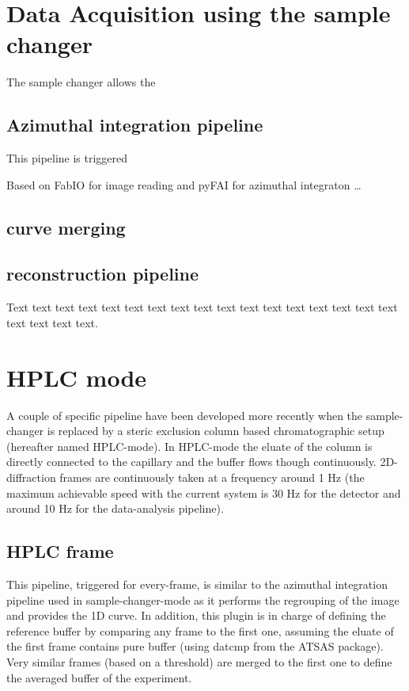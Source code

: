 \documentclass[preprint]{iucr}              %
\begin{document}
\section{Data Acquisition using the sample changer}

The sample changer allows the 


\subsection{Azimuthal integration pipeline}

This pipeline is triggered 

Based on FabIO\cite{fabio} for image reading and pyFAI\cite{pyFAI} for azimuthal
integraton \ldots

\subsection{curve merging}


\subsection{ reconstruction pipeline}

Text text text text text text text text text text text text text text
text text text text text text text.

\section{HPLC mode}

A couple of specific pipeline have been developed more recently when the
sample-changer is replaced by a steric exclusion column based  chromatographic
setup (hereafter named HPLC-mode).
In HPLC-mode the eluate of the column is directly connected to the capillary
and the buffer flows though continuously. 2D-diffraction frames are continuously
taken at a frequency around 1 Hz (the maximum achievable speed with the current
system is 30 Hz for the detector and around 10 Hz for the data-analysis
pipeline).
\subsection{HPLC frame}

This pipeline, triggered for every-frame, is similar to the azimuthal
integration pipeline used in sample-changer-mode as it performs the regrouping
of the image and provides the 1D curve.
In addition, this plugin is in charge of defining the reference buffer by
comparing any frame to the first one, assuming the eluate of the first frame
contains pure buffer (using datcmp from the ATSAS package).
Very similar frames (based on a threshold) are merged to the first one to define
the averaged buffer of the experiment.
\end{document}
